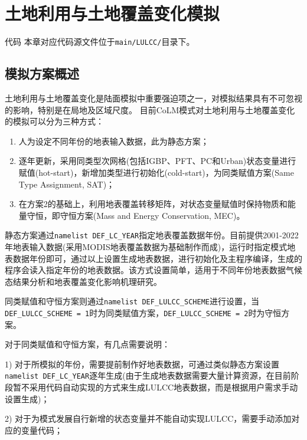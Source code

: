 \chapter{土地利用与土地覆盖变化模拟}\label{土地利用与土地覆盖变化模拟}
\begin{mymdframed}{代码}
  本章对应代码源文件位于\texttt{main/LULCC/}目录下。
\end{mymdframed}

\section{模拟方案概述}
土地利用与土地覆盖变化是陆面模拟中重要强迫项之一，对模拟结果具有不可忽视的影响，特别是在局地及区域尺度。
目前CoLM模式对土地利用与土地覆盖变化的模拟可以分为三种方式：
\begin{enumerate}
  \item 人为设定不同年份的地表输入数据，此为静态方案；
  \item 逐年更新，采用同类型次网格(包括IGBP、PFT、PC和Urban)状态变量进行赋值(hot-start)，新增加类型进行初始化(cold-start)，为同类赋值方案(Same Type Assignment, SAT)；
  \item 在方案2的基础上，利用地表覆盖转移矩阵，对状态变量赋值时保持物质和能量守恒，即守恒方案(Mass
    and Energy Conservation, MEC)。
\end{enumerate}

静态方案通过\texttt{namelist DEF\_LC\_YEAR}指定地表覆盖数据年份。目前提供2001-2022年地表输入数据(采用MODIS地表覆盖数据为基础制作而成)，运行时指定模式地表数据年份即可，通过以上设置生成地表数据，进行初始化及主程序编译，生成的程序会读入指定年份的地表数据。该方式设置简单，适用于不同年份地表数据气候态结果分析和地表覆盖变化影响机理研究。

同类赋值和守恒方案则通过\texttt{namelist DEF\_LULCC\_SCHEME}进行设置，当
\texttt{DEF\_LULCC\allowbreak \_SCHEME = 1}时为同类赋值方案，\texttt{DEF\_LULCC\_SCHEME = 2}时为守恒方案。

对于同类赋值和守恒方案，有几点需要说明：

1) 对于所模拟的年份，需要提前制作好地表数据，可通过类似静态方案设置\texttt{namelist DEF\_LC\_YEAR}逐年生成(由于生成地表数据需要大量计算资源，在目前阶段暂不采用代码自动实现的方式来生成LULCC地表数据，而是根据用户需求手动设置生成)；

2) 对于为模式发展自行新增的状态变量并不能自动实现LULCC，需要手动添加对应的变量代码；

